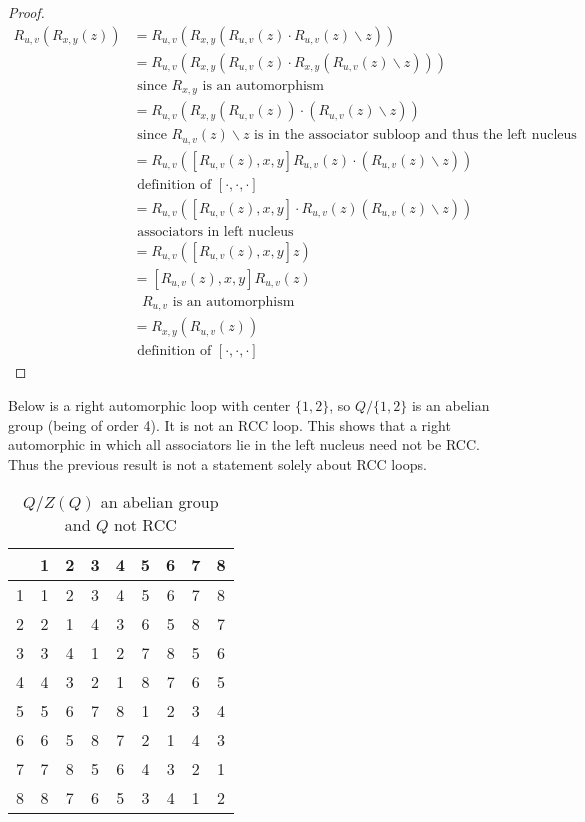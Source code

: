 \documentclass[12pt]{report}
\theoremstyle{definition}
\newcommand{\ldv}{\backslash}       %
\begin{document}
\begin{proof}
  \begin{align*}
    R_{u, v}(R_{x, y}(z)) &= R_{u, v}(R_{x, y}(R_{u, v}(z)\cdot R_{u, v}(z)\ldv z))\\
    &= R_{u, v}(R_{x,y}(R_{u,v}(z)\cdot R_{x, y}(R_{u,v}(z)\ldv z)))\\
    &\text{ since $R_{x, y}$ is an automorphism}\\
    &= R_{u, v}(R_{x, y}(R_{u, v}(z))\cdot (R_{u, v}(z)\ldv z))\\
    &\text{ since $R_{u, v}(z)\ldv z$ is in the associator subloop and thus the left nucleus}\\
    &= R_{u, v}([R_{u, v}(z), x, y]R_{u, v}(z)\cdot (R_{u, v}(z)\ldv z))\\
    & \text{ definition of $[\cdot, \cdot, \cdot]$}\\
    &= R_{u, v}([R_{u, v}(z), x, y]\cdot R_{u, v}(z)(R_{u,v}(z)\ldv z))\\
    &\text{ associators in left nucleus}\\
    &= R_{u, v}([R_{u, v}(z), x, y]z) &&\\
    &= [R_{u, v}(z), x, y]R_{u, v}(z)\\
    &\text{ $R_{u, v}$ is an automorphism}\\
    &= R_{x, y}(R_{u, v}(z))\\
    &\text{ definition of $[\cdot, \cdot, \cdot]$}
  \end{align*}
\end{proof}

Below is a right automorphic loop with center $\{1,2\}$, so $Q/\{1,2\}$ is an abelian
  group (being of order 4). It is not an RCC loop. This shows that a right automorphic
  in which all associators lie in the left nucleus need not be RCC. Thus the previous result
  is not a statement solely about RCC loops.

\begin{table}[H]
  \centering
  \begin{tabular}{c | c c c c c c c c}
    & 1 & 2 & 3 & 4 & 5 & 6 & 7 & 8\\
    \hline \hline
    1 & 1 & 2 & 3 & 4 & 5 & 6 & 7 & 8\\
    2 & 2 & 1 & 4 & 3 & 6 & 5 & 8 & 7\\
    3 & 3 & 4 & 1 & 2 & 7 & 8 & 5 & 6\\
    4 & 4 & 3 & 2 & 1 & 8 & 7 & 6 & 5\\
    5 & 5 & 6 & 7 & 8 & 1 & 2 & 3 & 4\\
    6 & 6 & 5 & 8 & 7 & 2 & 1 & 4 & 3\\
    7 & 7 & 8 & 5 & 6 & 4 & 3 & 2 & 1\\
    8 & 8 & 7 & 6 & 5 & 3 & 4 & 1 & 2
  \end{tabular}
  \caption{$Q/Z(Q)$ an abelian group and $Q$ not RCC}
\end{table}
\end{document}
